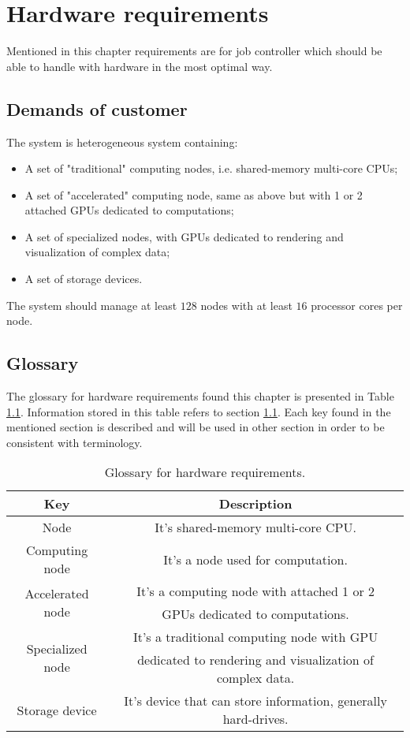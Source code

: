 \chapter{Hardware requirements} \label{sec:hardware_requirements}
	Mentioned in this chapter requirements are for job controller which should be able to handle with hardware in the most optimal way.
	
	\section{Demands of customer}
	\label{sec:hardware_requirements_demands}
		The system is heterogeneous system containing:
		\begin{itemize}
			\item A set of "traditional" computing nodes, i.e. shared-memory multi-core CPUs;
			\item A set of "accelerated" computing node, same as above  but with 1 or 2 attached GPUs dedicated to computations;
			\item A set of specialized nodes, with GPUs dedicated to rendering and visualization of complex data;
			\item A set of storage devices.
		\end{itemize}
		The system should manage at least $128$ nodes with at least $16$ processor cores per node.
	
	\section{Glossary} 
	\label{sec:hardware_requirements_glossary}
		The glossary for hardware requirements found this chapter is presented in Table \ref{tab:hardware_requirements_glossary}. Information stored in this table refers to section \ref{sec:hardware_requirements_demands}. Each key found in the mentioned section is described and will be used in other section in order to be consistent with terminology.
		\begin{table}[!htbp]
			\centering
			\caption{Glossary for hardware requirements.}
			\label{tab:hardware_requirements_glossary}
			\begin{tabular}{|c|c|}
				\hline
				\textbf{Key} & \textbf{Description} \\ \hline \hline
				Node & It's shared-memory multi-core CPU.\\ \hline
				Computing node & It's a node used for computation. \\ \hline
				\multirow{2}{*}{Accelerated node} &  It's a computing node with attached 1 or 2 \\ & GPUs dedicated to computations.\\ \hline
				\multirow{2}{*}{Specialized node} & It's a traditional computing node with GPU \\& dedicated to rendering and visualization of complex data. \\ \hline \hline
				Storage device & It's device that can store information, generally hard-drives. \\ \hline
			\end{tabular}
		\end{table}
	
